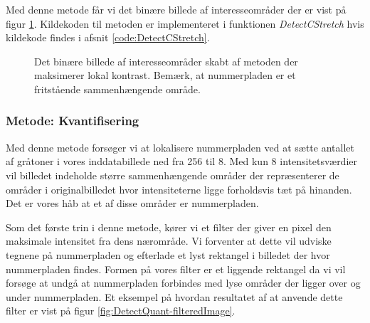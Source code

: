 Med denne metode får vi det binære billede af interesseområder der er vist på figur \ref{fig:DetectCStretch-binary}. Kildekoden til metoden er implementeret i funktionen \textit{DetectCStretch} hvis kildekode findes i afsnit \vref{code:DetectCStretch}.

\begin{figure}[htp]
  \centering
  \caption{Det binære billede af interesseområder skabt af metoden der maksimerer lokal kontrast. Bemærk, at nummerpladen er et fritstående sammenhængende område.}
  \label{fig:DetectCStretch-binary}
\end{figure}

\subsubsection{Metode: Kvantifisering}
Med denne metode forsøger vi at lokalisere nummerpladen ved at sætte antallet af gråtoner i vores inddatabillede ned fra 256 til 8. Med kun 8 intensitetsværdier vil billedet indeholde større sammenhængende områder der repræsenterer de områder i originalbilledet hvor intensiteterne ligge forholdsvis tæt på hinanden. Det er vores håb at et af disse områder er nummerpladen.

Som det første trin i denne metode, kører vi et filter der giver en pixel den maksimale intensitet fra dens nærområde. Vi forventer at dette vil udviske tegnene på nummerpladen og efterlade et lyst rektangel i billedet der hvor nummerpladen findes. Formen på vores filter er et liggende rektangel da vi vil forsøge at undgå at nummerpladen forbindes med lyse områder der ligger over og under nummerpladen. Et eksempel på hvordan resultatet af at anvende dette filter er vist på figur \vref{fig:DetectQuant-filteredImage}.

